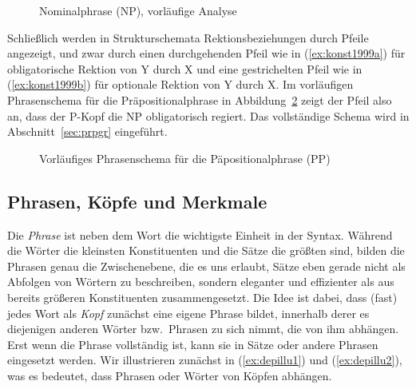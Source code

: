\begin{figure}[!htbp]
  \centering
  \caption{Nominalphrase (NP), vorläufige Analyse}
  \label{fig:vnflach}
\end{figure}

Schließlich werden in Strukturschemata Rektionsbeziehungen durch Pfeile angezeigt, und zwar durch einen durchgehenden Pfeil wie in (\ref{ex:konst1999a}) für obligatorische Rektion von Y durch X und eine gestrichelten Pfeil wie in (\ref{ex:konst1999b}) für optionale Rektion von Y durch X.
Im vorläufigen Phrasenschema für die Präpositionalphrase in Abbildung~\ref{fig:strschembsprek} zeigt der Pfeil also \zB an, dass der P-Kopf die NP obligatorisch regiert.
Das vollständige Schema wird in Abschnitt~\ref{sec:prpgr} eingeführt.

\begin{exe}
  \ex\label{ex:konst1999} 
  \begin{xlist}
  \end{xlist}
\end{exe}

\begin{figure}[!htbp]
  \centering
  \colorbox{lightgray}{
  }
  \caption{Vorläufiges Phrasenschema für die Päpositionalphrase (PP)}
  \label{fig:strschembsprek}
\end{figure}

\subsection{Phrasen, Köpfe und Merkmale}

\label{sec:koepfevalenzmaximalitaet}

Die \textit{Phrase} ist neben dem Wort die wichtigste Einheit in der Syntax.
Während die Wörter die kleinsten Konstituenten und die Sätze die größten sind, bilden die Phrasen genau die Zwischenebene, die es uns erlaubt, Sätze eben gerade nicht als Abfolgen von Wörtern zu beschreiben,
sondern eleganter und effizienter als aus bereits größeren Konstituenten zusammengesetzt.
Die Idee ist dabei, dass (fast) jedes Wort als \textit{Kopf} zunächst eine eigene Phrase bildet, innerhalb derer es diejenigen anderen Wörter bzw.\ Phrasen zu sich nimmt, die von ihm abhängen.
Erst wenn die Phrase vollständig ist, kann sie in Sätze oder andere Phrasen eingesetzt werden.
Wir illustrieren zunächst in (\ref{ex:depillu1}) und (\ref{ex:depillu2}), was es bedeutet, dass Phrasen oder Wörter von Köpfen abhängen.

